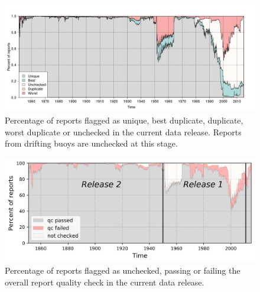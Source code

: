 \begin{figure}[h]
    \includegraphics[width=1\textwidth]{resources/duplicate_status-ts_new.png}
    \caption{Percentage of reports flagged as unique, best duplicate, duplicate, worst duplicate or unchecked in the current data release. Reports from drifting buoys are unchecked at this stage.}
    \label{fig:dup_status}
\end{figure}

\begin{figure}[h]
    \includegraphics[width=1\textwidth]{resources/report_quality-ts.png}
    \caption{Percentage of reports flagged as unchecked, passing or failing the overall report quality check in the current data release.}
    \label{fig:report_qc}
\end{figure}
